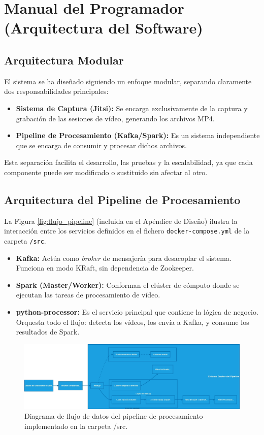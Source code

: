 \section{Manual del Programador (Arquitectura del Software)}

\subsection{Arquitectura Modular}
El sistema se ha diseñado siguiendo un enfoque modular, separando claramente dos responsabilidades principales:
\begin{itemize}
    \item \textbf{Sistema de Captura (Jitsi):} Se encarga exclusivamente de la captura y grabación de las sesiones de vídeo, generando los archivos MP4.
    \item \textbf{Pipeline de Procesamiento (Kafka/Spark):} Es un sistema independiente que se encarga de consumir y procesar dichos archivos.
\end{itemize}
Esta separación facilita el desarrollo, las pruebas y la escalabilidad, ya que cada componente puede ser modificado o sustituido sin afectar al otro.

\subsection{Arquitectura del Pipeline de Procesamiento}
La Figura \ref{fig:flujo_pipeline} (incluida en el Apéndice de Diseño) ilustra la interacción entre los servicios definidos en el fichero \texttt{docker-compose.yml} de la carpeta \texttt{/src}.
\begin{itemize}
    \item \textbf{Kafka:} Actúa como \textit{broker} de mensajería para desacoplar el sistema. Funciona en modo KRaft, sin dependencia de Zookeeper.
    \item \textbf{Spark (Master/Worker):} Conforman el clúster de cómputo donde se ejecutan las tareas de procesamiento de vídeo.
    \item \textbf{python-processor:} Es el servicio principal que contiene la lógica de negocio. Orquesta todo el flujo: detecta los vídeos, los envía a Kafka, y consume los resultados de Spark.
\end{itemize}

\begin{figure}[H]
    \centering
    \includegraphics[width=\textwidth]{img/FlujodeDatosdelPipelinedeProcesamiento.jpg}
    \caption{Diagrama de flujo de datos del pipeline de procesamiento implementado en la carpeta /src.}
    \label{fig:apendice_d_flujo_pipeline}
\end{figure}

